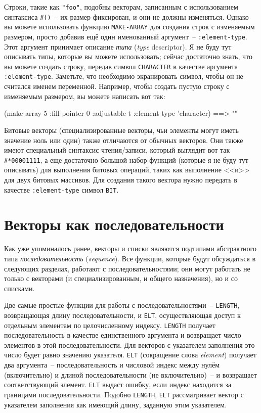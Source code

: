Строки, такие как \lstinline{"foo"}, подобны векторам, записанным с использованием синтаксиса
\lstinline!#()!~-- их размер фиксирован, и они не должны изменяться.  Однако вы можете
использовать функцию \lstinline{MAKE-ARRAY} для создания строк с изменяемым размером, просто
добавив ещё один именованный аргумент~-- \lstinline{:element-type}.  Этот аргумент принимает
описание \textit{типа} (\textit{type} descriptor).  Я не буду тут описывать типы, которые
вы можете использовать; сейчас достаточно знать, что вы можете создать строку, передав символ
\lstinline{CHARACTER} в качестве аргумента \lstinline{:element-type}.  Заметьте, что необходимо экранировать
символ, чтобы он не считался именем переменной.  Например, чтобы создать пустую строку с
изменяемым размером, вы можете написать вот так:

\begin{myverb}
  (make-array 5 :fill-pointer 0 :adjustable t :element-type 'character) ==> ""
\end{myverb}

Битовые векторы (специализированные векторы, чьи элементы могут иметь значение ноль или
один) также отличаются от обычных векторов.  Они также имеют специальный синтаксис
чтения/записи, который выглядит вот так \lstinline!#*00001111!, а еще достаточно большой
набор функций (которые я не буду тут описывать) для выполнения битовых операций, таких как
выполнение <<и>> для двух битовых массивов.  Для создания такого вектора нужно передать
в качестве \lstinline{:element-type} символ \lstinline{BIT}.

\section{Векторы как последовательности}

Как уже упоминалось ранее, векторы и списки являются подтипами абстрактного типа
\textit{последовательность} (\textit{sequence}).  Все функции, которые будут обсуждаться
в следующих разделах, работают с последовательностями; они могут работать не только с векторами
(и специализированным, и общего назначения), но и со списками.

Две самые простые функции для работы с последовательностями~-- \lstinline{LENGTH},
возвращающая длину последовательности, и \lstinline{ELT}, осуществляющая доступ к
отдельным элементам по целочисленному индексу.  \lstinline{LENGTH} получает
последовательность в качестве единственного аргумента и возвращает число элементов в этой
последовательности.  Для векторов с указателем заполнения это число будет равно значению
указателя. \lstinline{ELT} (сокращение слова \textit{element}) получает два аргумента~--
последовательность и числовой индекс между нулём (включительно) и длиной
последовательности (не включительно)~-- и возвращает соответствующий элемент.  \lstinline{ELT} выдаст ошибку,
если индекс находится за границами последовательности.  Подобно \lstinline{LENGTH}, \lstinline{ELT}
рассматривает вектор с указателем заполнения как имеющий длину, заданную этим
указателем.

